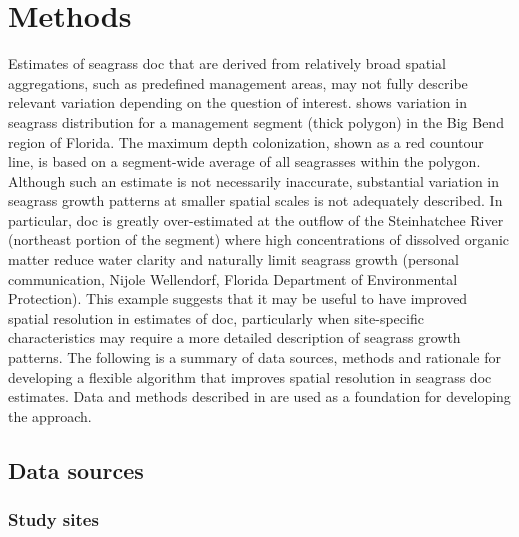 \documentclass[letterpaper,12pt,oneside]{article}\usepackage[]{graphicx}\usepackage[]{color}
\begin{document}
\section{Methods}

Estimates of seagrass \ac{doc} that are derived from relatively broad spatial aggregations, such as predefined management areas, may not fully describe relevant variation depending on the question of interest.  shows variation in seagrass distribution for a management segment (thick polygon) in the Big Bend region of Florida.  The maximum depth colonization, shown as a red countour line, is based on a segment-wide average of all seagrasses within the polygon.  Although such an estimate is not necessarily inaccurate, substantial variation in seagrass growth patterns at smaller spatial scales is not adequately described. In particular, \ac{doc} is greatly over-estimated at the outflow of the Steinhatchee River (northeast portion of the segment) where high concentrations of dissolved organic matter reduce water clarity and naturally limit seagrass growth (personal communication, Nijole Wellendorf, Florida Department of Environmental Protection).  This example suggests that it may be useful to have improved spatial resolution in estimates of \ac{doc}, particularly when site-specific characteristics may require a more detailed description of seagrass growth patterns.  The following is a summary of data sources, methods and rationale for developing a flexible algorithm that improves spatial resolution in seagrass \ac{doc} estimates.  Data and methods described in  are used as a foundation for developing the approach.

\subsection{Data sources}

\subsubsection{Study sites}
\end{document}
